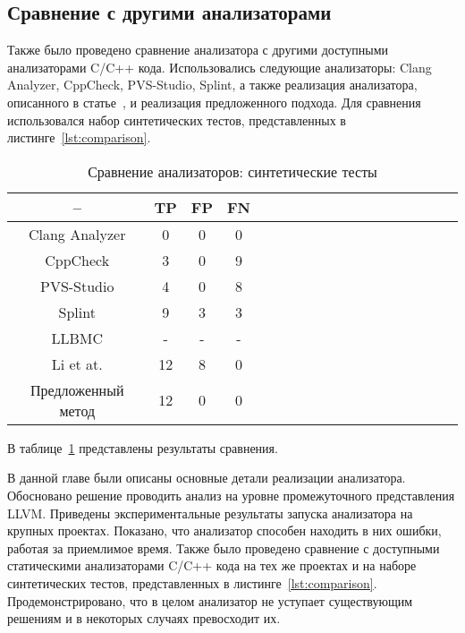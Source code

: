\subsection{Сравнение с другими анализаторами}

Также было проведено сравнение анализатора с другими доступными
анализаторами C/C++ кода. Использовались следующие анализаторы: Clang
Analyzer, CppCheck, PVS-Studio, Splint, а также реализация
анализатора, описанного в статье~\cite{li2010practical}, и реализация
предложенного подхода. Для сравнения использовался набор синтетических
тестов, представленных в листинге~\ref{lst:comparison}.

\begin{table}[!h]
\caption{Сравнение анализаторов: синтетические тесты}\label{tab:comparison-synthetic}
\centering
  \begin{tabular}{|*{18}{c|}}\hline
  --                 & TP  & FP & FN \\\hline
  Clang Analyzer     & 0   & 0  & 0  \\\hline
  CppCheck           & 3   & 0  & 9  \\\hline
  PVS-Studio         & 4   & 0  & 8  \\\hline
  Splint             & 9   & 3  & 3  \\\hline
  LLBMC              & -   & -  & -  \\\hline
  Li et at.          & 12  & 8  & 0  \\\hline
  Предложенный метод & 12  & 0  & 0  \\\hline
  \end{tabular}
\end{table}

В таблице~\ref{tab:comparison-synthetic} представлены результаты сравнения.

\chapterconclusion

В данной главе были описаны основные детали реализации
анализатора. Обосновано решение проводить анализ на уровне
промежуточного представления LLVM.  Приведены экспериментальные
результаты запуска анализатора на крупных проектах. Показано, что
анализатор способен находить в них ошибки, работая за приемлимое
время. Также было проведено сравнение с доступными статическими
анализаторами C/C++ кода на тех же проектах и на наборе синтетических
тестов, представленных в
листинге~\ref{lst:comparison}. Продемонстрировано, что в целом
анализатор не уступает существующим решениям и в некоторых случаях
превосходит их.

